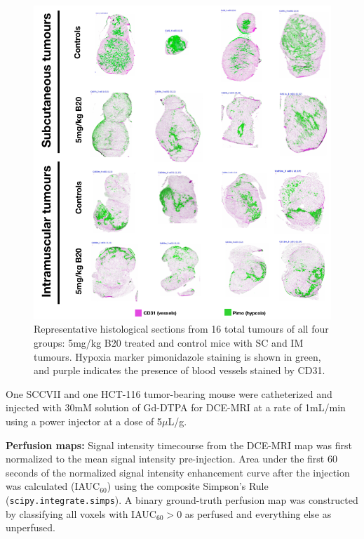 \begin{figure}[htbp]
   \centering
   \includegraphics[width=\textwidth]{oemri_thesis3/oemri_thesis3-images/5_oep8_imsc_histo.png} %
   \caption{Representative histological sections from 16 total tumours of all four groups: 5mg/kg B20 treated and control mice with SC and IM tumours.
   Hypoxia marker pimonidazole staining is shown in green, and purple indicates the presence of blood vessels stained by CD31.}
   \label{allHisto}
\end{figure}


One SCCVII and one HCT-116 tumor-bearing mouse were catheterized and injected with 30mM solution of Gd-DTPA for DCE-MRI at a rate of 1mL/min using a power injector at a dose of 5$\mu$L/g.


\noindent\textbf{Perfusion maps:} Signal intensity timecourse from the DCE-MRI map was first normalized to the mean signal intensity pre-injection.
Area under the first 60 seconds of the normalized signal intensity enhancement curve after the injection was calculated (IAUC$_{60}$) using the composite Simpson's Rule (\texttt{scipy.integrate.simps}).
A binary ground-truth perfusion map was constructed by classifying all voxels with IAUC$_{60} > 0$ as perfused and everything else as unperfused.





